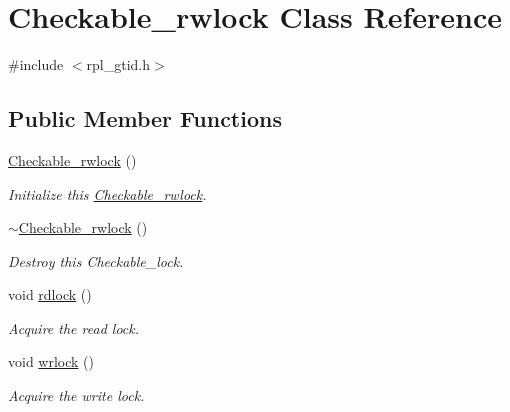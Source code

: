 \hypertarget{classCheckable__rwlock}{}\section{Checkable\+\_\+rwlock Class Reference}
\label{classCheckable__rwlock}


{\ttfamily \#include $<$rpl\+\_\+gtid.\+h$>$}

\subsection*{Public Member Functions}
\begin{DoxyCompactItemize}
\item 
\mbox{\label{classCheckable__rwlock_acd95df77c30e253460b37564dbc62438}} 
\mbox{\hyperlink{classCheckable__rwlock_acd95df77c30e253460b37564dbc62438}{Checkable\+\_\+rwlock}} ()
\begin{DoxyCompactList}\small\item\em Initialize this \mbox{\hyperlink{classCheckable__rwlock}{Checkable\+\_\+rwlock}}. \end{DoxyCompactList}\item 
\mbox{\label{classCheckable__rwlock_a723b97572b532987ba8e6a0b8c7a1ecf}} 
\mbox{\hyperlink{classCheckable__rwlock_a723b97572b532987ba8e6a0b8c7a1ecf}{$\sim$\+Checkable\+\_\+rwlock}} ()
\begin{DoxyCompactList}\small\item\em Destroy this Checkable\+\_\+lock. \end{DoxyCompactList}\item 
\mbox{\label{classCheckable__rwlock_a4ad513078fb56a8124851230698302de}} 
void \mbox{\hyperlink{classCheckable__rwlock_a4ad513078fb56a8124851230698302de}{rdlock}} ()
\begin{DoxyCompactList}\small\item\em Acquire the read lock. \end{DoxyCompactList}\item 
\mbox{\label{classCheckable__rwlock_a4bd09795d0037c26253c97fdc9d7747b}} 
void \mbox{\hyperlink{classCheckable__rwlock_a4bd09795d0037c26253c97fdc9d7747b}{wrlock}} ()
\begin{DoxyCompactList}\small\item\em Acquire the write lock. \end{DoxyCompactList}\item 

\end{DoxyCompactItemize}
